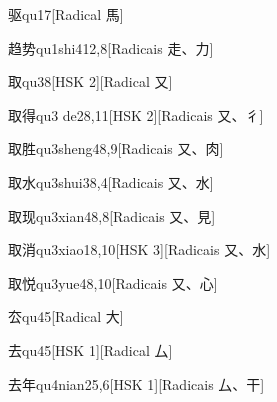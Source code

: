 \begin{entry}{驱}{qu1}{7}[Radical ⾺]
\end{entry}

\begin{entry}{趋势}{qu1shi4}{12,8}[Radicais ⾛、⼒]
\end{entry}

\begin{entry}{取}{qu3}{8}[HSK 2][Radical ⼜]
\end{entry}

\begin{entry}{取得}{qu3 de2}{8,11}[HSK 2][Radicais ⼜、⼻]
\end{entry}

\begin{entry}{取胜}{qu3sheng4}{8,9}[Radicais ⼜、⾁]
\end{entry}

\begin{entry}{取水}{qu3shui3}{8,4}[Radicais ⼜、⽔]
\end{entry}

\begin{entry}{取现}{qu3xian4}{8,8}[Radicais ⼜、⾒]
\end{entry}

\begin{entry}{取消}{qu3xiao1}{8,10}[HSK 3][Radicais ⼜、⽔]
\end{entry}

\begin{entry}{取悦}{qu3yue4}{8,10}[Radicais ⼜、⼼]
\end{entry}

\begin{entry}{厺}{qu4}{5}[Radical ⼤]
\end{entry}

\begin{entry}{去}{qu4}{5}[HSK 1][Radical ⼛]
\end{entry}

\begin{entry}{去年}{qu4nian2}{5,6}[HSK 1][Radicais ⼛、⼲]
\end{entry}

